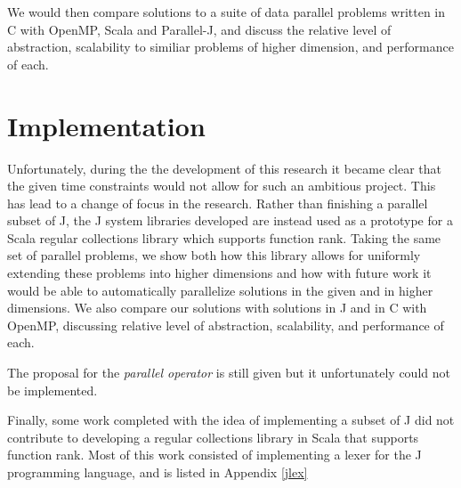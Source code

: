 We would then compare solutions to a suite of data parallel problems written in C with OpenMP, Scala and Parallel-J,
and discuss the relative level of abstraction, scalability to similiar problems of higher dimension, and performance of each.

\section{Implementation}
\label{imp}
Unfortunately, during the the development of this research it became clear that the given time constraints would not allow for such an ambitious project.
This has lead to a change of focus in the research. 
Rather than finishing a parallel subset of J, the J system libraries developed 
are instead used as a prototype for a Scala regular collections library which supports function rank.
Taking the same set of parallel problems, we show both how this library allows for uniformly extending these problems into higher dimensions and 
how with future work it would be able to automatically parallelize solutions in the given and in higher dimensions.
We also compare our solutions with solutions in J and in C with OpenMP, discussing relative level of abstraction, scalability, and performance of each.

The proposal for the \textit{parallel operator} is still given but it unfortunately could not be implemented.

Finally, some work completed with the idea of implementing a subset of J did not contribute to developing a regular collections library in Scala that supports function rank.
Most of this work consisted of implementing a lexer for the J programming language, and is listed in Appendix \ref{jlex}

\nocite{rankanduni}
\nocite{dph}

\begin{comment}
Data rank is simply the rank of a collection, and scalar values are considered to be collections of rank 0.
Thus, the rank of some regular collection is a non-negative integer.%
Function rank is a rank 1 collection of each of the associated data rank values of a function's expected arguments, usually with some value to represent when the function can take data of any rank for a specific argument.
\end{comment}


